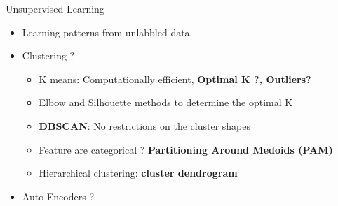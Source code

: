 \documentclass[12pt,ignorenonframetext,]{beamer}
\providecommand{\tightlist}{%
  \setlength{\itemsep}{0pt}\setlength{\parskip}{0pt}}
\begin{document}
\begin{frame}{Unsupervised Learning}
\protect\hypertarget{unsupervised-learning}{}

\begin{itemize}
\tightlist
\item
  Learning patterns from unlabbled data. \vspace{2mm}
\item
  Clustering ? \vspace{2mm}

  \begin{itemize}
      \item K means: Computationally efficient, \textbf{Optimal K ?, Outliers?}
      \item Elbow and Silhouette methods to determine the optimal K
      \item \textbf{DBSCAN}: No restrictions on the cluster shapes
      \item Feature are categorical ? \textbf{Partitioning Around Medoids (PAM)}
      \item Hierarchical clustering: \textbf{cluster dendrogram}
    \end{itemize}
  \vspace{2mm}
\item
  Auto-Encoders ?
\end{itemize}

\end{frame}
\end{document}
